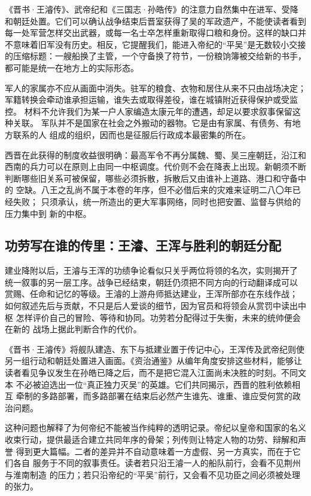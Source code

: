 《晋书·王濬传》、武帝纪和《三国志·孙皓传》的注意力自然集中在进军、受降
和朝廷处置。它们可以确认战争结束后晋室获得了吴的军政遗产，不能使读者看到
每一处军营怎样交出武器，或每一名士卒怎样重新取得口粮和身份。这样的缺口并
不意味着旧军没有历史。相反，它提醒我们，能进入帝纪的“平吴”是无数较小交接
的压缩标题：一艘船换了主管，一个守备换了符节，一份粮饷簿被交给新的书手，
都可能是统一在地方上的实际形态。

军人的家属亦不应从画面中消失。驻军的粮食、衣物和居住从来不只由战场决定；
军籍转换会牵动谁承担运输，谁失去或取得差役，谁在城镇附近获得保护或受监控。
材料不允许我们为某一户人家编造太康元年的遭遇，却足以要求叙事保留这种关联。
军队并不是国家在社会之外搬动的器物。它是由有家属、有债务、有地方联系的人
组成的组织，因而也是征服后行政成本最密集的所在。

西晋在此获得的制度收益很明确：最高军令不再分属魏、蜀、吴三座朝廷，沿江和
西南的兵力可以在原则上由同一中枢调度。代价则不会在降表上出现。新朝须不断
判断哪些旧关系可被保留，哪些必须拆散，拆散后又由谁补上道路、港口和守备中的
空缺。八王之乱尚不属于本卷的年序，但不必借后来的灾难来证明二八〇年已经失败；
只须承认，统一所造出的更大军事网络，同时也把安置、监督与供给的压力集中到
新的中枢。

\subsection{功劳写在谁的传里：王濬、王浑与胜利的朝廷分配}

建业降附以后，王濬与王浑的功绩争论看似只关乎两位将领的名次，实则揭开了
统一叙事的另一层工序。战争已经结束，朝廷仍须把不同方向的行动翻译成可以
赏赐、任命和记忆的等级。王濬的上游舟师抵达建业，王浑所部亦在东线作战；
如何叙述先后与贡献，不只是后人爱谈的细节，因为官员和将领会从赏罚中读出中枢
怎样评价自己的冒险、等待和协同。功劳若分配得过于失衡，未来的统帅便会在新的
战场上据此判断合作的代价。

《晋书·王濬传》将舰队建造、东下与抵建业置于传记中心，王浑传及武帝纪则使
另一组行动和朝廷处置进入画面。《资治通鉴》从编年角度安排这些材料，能够让
读者看见争议发生在孙皓已降之后，而不是把它混入江面尚未决胜的时刻。不同文本
不必被迫选出一位“真正独力灭吴”的英雄。它们共同揭示，西晋的胜利依赖相互
牵制的多路部署，而多路部署在结束后必然产生谁先、谁重、谁应受何赏的政治问题。

这种问题也解释了为何帝纪不能被当作纯粹的透明记录。帝纪以皇帝和国家的名义
收束行动，提供最适合建立共同年序的骨架；列传则让特定人物的功劳、辩解和声誉
得到更大篇幅。二者的差异并不自动意味着一方虚假、另一方真实，而在于它们各自
服务于不同的叙事责任。读者若只沿王濬一人的船队前行，会看不见荆州与淮南制造
的压力；若只沿帝纪的“平吴”前行，又会看不见功臣之间必须被处理的张力。

